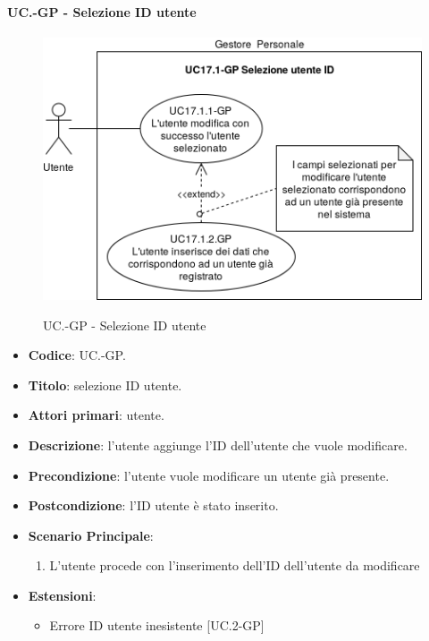 	\paragraph{UC\theuccount.\thesubuccount-GP - Selezione ID utente}
		\begin{figure}[H]
			\centering
			\includegraphics[width=\columnwidth]{img/casi_d'uso/UC17_1.png}\\
			\caption{UC\theuccount.\thesubuccount-GP - Selezione ID utente}
		\end{figure}
		\begin{itemize}
			\item \textbf{Codice}: UC\theuccount.\thesubuccount-GP.
			\item \textbf{Titolo}: selezione ID utente.
			\item \textbf{Attori primari}: utente.
			\item \textbf{Descrizione}: l'utente aggiunge l'ID dell'utente che vuole modificare.
			\item \textbf{Precondizione}: l'utente vuole modificare un utente già presente.
			\item \textbf{Postcondizione}: l'ID utente è stato inserito.
			\item \textbf{Scenario Principale}:
			\begin{enumerate}
				\item L'utente procede con l'inserimento dell'ID dell'utente da modificare
			\end{enumerate}
			\item \textbf{Estensioni}:
			\begin{itemize}
				\item Errore ID utente inesistente [UC\theuccount.2-GP]
			\end{itemize}
		\end{itemize}
		
